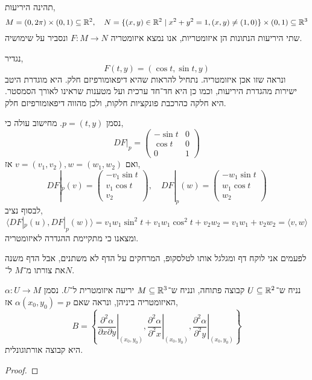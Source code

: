 \subquestion{}
תהינה היריעות,
\[
	M = (0, 2 \pi) \times (0, 1) \subseteq \mathbb{R}^2,
	\quad
	N = \{ (x, y) \in \mathbb{R}^2 \mid x^2 + y^2 = 1, (x, y) \ne (1, 0) \} \times (0, 1) \subseteq \mathbb{R}^3
\]
שתי היריעות הנתונות הן איזומטריות, אנו נמצא איזומטריה $F : M \to N$ ונסביר על שימושיה.
\begin{solution}
	נגדיר,
	\[
		F(t, y)
		= (\cos t, \sin t, y)
	\]
	ונראה שזו אכן איזומטריה.
	נתחיל להראות שהיא דיפאומורפיזם חלק.
	היא מוגדרת היטב ישירות מהגדרת היריעות, וכמו כן היא חד־חד ערכית ועל מטענות שראינו לאורך הסמסטר.
	היא חלקה כהרכבת פונקציות חלקות, ולכן מהווה דיפאומורפיזם חלק.

	נסמן $p = (t, y)$.
	מחישוב עולה כי,
	\[
		D F |_p
		= \begin{pmatrix}
			- \sin t & 0 \\
			\cos t & 0 \\
			0 & 1
		\end{pmatrix} 
	\]
	ואם $v = (v_1, v_2), w = (w_1, w_2)$ אז,
	\[
		D F |_{p}(v)
		= \begin{pmatrix} - v_1 \sin t \\ v_1 \cos t \\ v_2 \end{pmatrix},
		\quad
		D F |_{p}(w)
		= \begin{pmatrix} - w_1 \sin t \\ w_1 \cos t \\ w_2 \end{pmatrix}
	\]
	לבסוף נציב,
	\[
		\langle D F |_p(u), D F |_p(w) \rangle
		= v_1 w_1 \sin^2 t + v_1 w_1 \cos^2 t + v_2 w_2
		= v_1 w_1 + v_2 w_2
		= \langle v, w \rangle
	\]
	ומצאנו כי מתקיימת ההגדרה לאיזומטריה.

	לפעמים אני לוקח דף ומגלגל אותו לטלסקופ, המרחקים על הדף לא משתנים, אבל הדף משנה את צורתו מ־$M$ ל־$N$.
\end{solution}

\subquestion{}
נניח ש־$U \subseteq \mathbb{R}^2$ קבוצה פתוחה, ונניח ש־$M \subseteq \mathbb{R}^3$ יריעה איזומטרית ל־$U$.
נסמן $\alpha : U \to M$ האיזומטריה ביניהן, ונראה שאם $\alpha(x_0, y_0) = p$ אז,
\[
	B = 
	\left\{
	\left. \frac{\partial^2 \alpha}{\partial x \partial y} \right\rvert_{(x_0, y_0)},
	\left. \frac{\partial^2 \alpha}{\partial^2 x} \right\rvert_{(x_0, y_0)},
	\left. \frac{\partial^2 \alpha}{\partial^2 y} \right\rvert_{(x_0, y_0)}
	\right\}
\]
היא קבוצה אורתוגונלית.
\begin{proof}
	
\end{proof}


